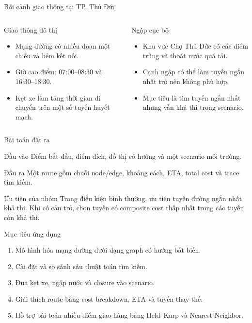 \documentclass[aspectratio=169,11pt]{beamer}
\begin{document}
\begin{frame}{Bối cảnh giao thông tại TP. Thủ Đức}
\begin{columns}[T]
\begin{block}{Giao thông đô thị}
\begin{itemize}
  \item Mạng đường có nhiều đoạn một chiều và hẻm kết nối.
  \item Giờ cao điểm: 07:00--08:30 và 16:30--18:30.
  \item Kẹt xe làm tăng thời gian di chuyển trên một số tuyến huyết mạch.
\end{itemize}
\end{block}
\begin{block}{Ngập cục bộ}
\begin{itemize}
  \item Khu vực Chợ Thủ Đức có các điểm trũng và thoát nước quá tải.
  \item Cạnh ngập có thể làm tuyến ngắn nhất trở nên không phù hợp.
  \item Mục tiêu là tìm tuyến ngắn nhất nhưng vẫn khả thi trong scenario.
\end{itemize}
\end{block}
\end{columns}
\end{frame}

\begin{frame}{Bài toán đặt ra}
\begin{block}{Đầu vào}
Điểm bắt đầu, điểm đích, đồ thị có hướng và một scenario môi trường.
\end{block}
\begin{block}{Đầu ra}
Một route gồm chuỗi node/edge, khoảng cách, ETA, total cost và trace tìm kiếm.
\end{block}
\begin{alertblock}{Ưu tiên của nhóm}
Trong điều kiện bình thường, ưu tiên tuyến đường ngắn nhất khả thi. Khi có cản trở, chọn tuyến có composite cost thấp nhất trong các tuyến còn khả thi.
\end{alertblock}
\end{frame}

\begin{frame}{Mục tiêu ứng dụng}
\begin{enumerate}
  \item Mô hình hóa mạng đường dưới dạng graph có hướng bất biến.
  \item Cài đặt và so sánh sáu thuật toán tìm kiếm.
  \item Đưa kẹt xe, ngập nước và closure vào scenario.
  \item Giải thích route bằng cost breakdown, ETA và tuyến thay thế.
  \item Hỗ trợ bài toán nhiều điểm giao hàng bằng Held--Karp và Nearest Neighbor.
\end{enumerate}
\end{frame}
\end{document}
